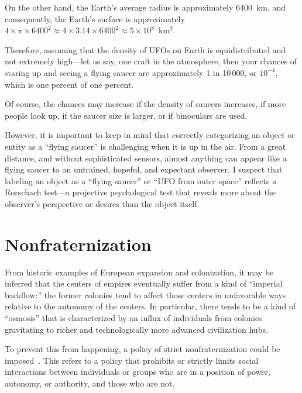 On the other hand, the Earth's average radius is approximately 6400~km, and consequently, the Earth's surface is approximately $4\times \pi \times 6400^2 \approx 4\times 3.14 \times 6400^2 \approx 5 \times 10^8$~km$^2$.

Therefore, assuming that the density of UFOs on Earth is equidistributed and not extremely high---let us say, one craft in the atmosphere, then your chances of staring up and seeing a flying saucer are approximately 1 in 10\,000, or $10^{-4}$,
which is one percent of one percent.

Of course, the chances may increase if the density of saucers increases,
if more people look up,
if the saucer size is larger, or if binoculars are used.

However, it is important to keep in mind that correctly categorizing an object or entity as a ``flying saucer''
is challenging when it is up in the air. From a great distance, and without sophisticated sensors,
almost anything can appear like a flying saucer to an untrained, hopeful, and expectant observer.
I suspect that labeling an object as a ``flying saucer'' or ``UFO from outer space'' reflects a Rorschach test---a
projective psychological test that reveals more about the observer's perspective or desires than the object itself.





\section{Nonfraternization}
\label{2023-UFO-part-Speculation-among-hypercivilization-zoo-hypothesis-nfp}

From historic examples of European expansion and colonization, it may be inferred that the centers of empires eventually suffer from a kind of ``imperial backflow:'' the former colonies tend to affect those centers in unfavorable ways relative to the autonomy of the centers. In particular, there tends to be a kind of ``osmosis'' that is characterized by an influx of individuals from colonies gravitating to richer and technologically more advanced civilization hubs.

To prevent this from happening, a policy of strict nonfraternization could be imposed~\cite{GulfOfSilencey2020}.
This refers to a policy that prohibits or strictly limits social interactions between individuals or groups who are in a position of power,
 autonomy, or authority, and those who are not.


